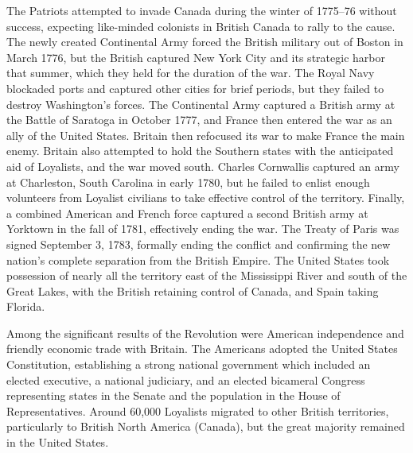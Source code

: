 \documentclass[
  openany]{book}
\begin{document}
The Patriots attempted to invade Canada during the winter of 1775--76 without success, expecting like-minded colonists in British Canada to rally to the cause. The newly created Continental Army forced the British military out of Boston in March 1776, but the British captured New York City and its strategic harbor that summer, which they held for the duration of the war. The Royal Navy blockaded ports and captured other cities for brief periods, but they failed to destroy Washington's forces. The Continental Army captured a British army at the Battle of Saratoga in October 1777, and France then entered the war as an ally of the United States. Britain then refocused its war to make France the main enemy. Britain also attempted to hold the Southern states with the anticipated aid of Loyalists, and the war moved south. Charles Cornwallis captured an army at Charleston, South Carolina in early 1780, but he failed to enlist enough volunteers from Loyalist civilians to take effective control of the territory. Finally, a combined American and French force captured a second British army at Yorktown in the fall of 1781, effectively ending the war. The Treaty of Paris was signed September 3, 1783, formally ending the conflict and confirming the new nation's complete separation from the British Empire. The United States took possession of nearly all the territory east of the Mississippi River and south of the Great Lakes, with the British retaining control of Canada, and Spain taking Florida.

Among the significant results of the Revolution were American independence and friendly economic trade with Britain. The Americans adopted the United States Constitution, establishing a strong national government which included an elected executive, a national judiciary, and an elected bicameral Congress representing states in the Senate and the population in the House of Representatives. Around 60,000 Loyalists migrated to other British territories, particularly to British North America (Canada), but the great majority remained in the United States.



  
\end{document}

